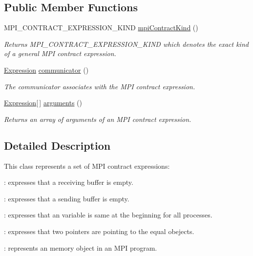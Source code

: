 \subsection*{Public Member Functions}
\begin{DoxyCompactItemize}
\item 
M\+P\+I\+\_\+\+C\+O\+N\+T\+R\+A\+C\+T\+\_\+\+E\+X\+P\+R\+E\+S\+S\+I\+O\+N\+\_\+\+K\+I\+N\+D \hyperlink{interfaceedu_1_1udel_1_1cis_1_1vsl_1_1civl_1_1model_1_1IF_1_1expression_1_1MPIContractExpression_a6e223f8fce3012f41cdbfe40d880de6d}{mpi\+Contract\+Kind} ()
\begin{DoxyCompactList}\small\item\em Returns M\+P\+I\+\_\+\+C\+O\+N\+T\+R\+A\+C\+T\+\_\+\+E\+X\+P\+R\+E\+S\+S\+I\+O\+N\+\_\+\+K\+I\+N\+D which denotes the exact kind of a general M\+P\+I contract expression. \end{DoxyCompactList}\item 
\hyperlink{interfaceedu_1_1udel_1_1cis_1_1vsl_1_1civl_1_1model_1_1IF_1_1expression_1_1Expression}{Expression} \hyperlink{interfaceedu_1_1udel_1_1cis_1_1vsl_1_1civl_1_1model_1_1IF_1_1expression_1_1MPIContractExpression_a7c86ad589923a5b6c5c797dd92e8bea4}{communicator} ()
\begin{DoxyCompactList}\small\item\em The communicator associates with the M\+P\+I contract expression. \end{DoxyCompactList}\item 
\hyperlink{interfaceedu_1_1udel_1_1cis_1_1vsl_1_1civl_1_1model_1_1IF_1_1expression_1_1Expression}{Expression}\mbox{[}$\,$\mbox{]} \hyperlink{interfaceedu_1_1udel_1_1cis_1_1vsl_1_1civl_1_1model_1_1IF_1_1expression_1_1MPIContractExpression_a6e7d75c8779d3e9bed1990c38bf9fc17}{arguments} ()
\begin{DoxyCompactList}\small\item\em Returns an array of arguments of an M\+P\+I contract expression. \end{DoxyCompactList}\end{DoxyCompactItemize}


\subsection{Detailed Description}
This class represents a set of M\+P\+I contract expressions\+: 


\begin{DoxyEnumerate}
\item \+: expresses that a receiving buffer is empty. 
\item \+: expresses that a sending buffer is empty. 
\item \+: expresses that an variable is same at the beginning for all processes. 
\item \+: expresses that two pointers are pointing to the equal obejects. 
\item \+: represents an memory object in an M\+P\+I program. 
\end{DoxyEnumerate}

